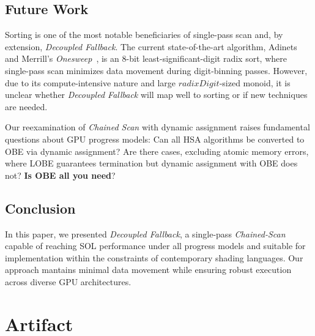 \documentclass[sigconf]{acmart}
\begin{document}
\subsection{Future Work}
Sorting is one of the most notable beneficiaries of single-pass scan and, by extension, \emph{Decoupled Fallback}. The current state-of-the-art algorithm, Adinets and Merrill’s \emph{Onesweep}~\cite{adinets2022onesweepfastersignificantdigit}, is an 8-bit least-significant-digit radix sort, where single-pass scan minimizes data movement during digit-binning passes. However, due to its compute-intensive nature and large $radixDigit$-sized monoid, it is unclear whether \emph{Decoupled Fallback} will map well to sorting or if new techniques are needed.

Our reexamination of \emph{Chained Scan} with dynamic assignment raises fundamental questions about GPU progress models: Can all HSA algorithms be converted to OBE via dynamic assignment? Are there cases, excluding atomic memory errors, where LOBE guarantees termination but dynamic assignment with OBE does not? \textbf{Is OBE all you need}?

\subsection{Conclusion}
In this paper, we presented \emph{Decoupled Fallback}, a single-pass \emph{Chained-Scan} capable of reaching SOL performance under all progress models and suitable for implementation within the constraints of contemporary shading languages. Our approach mantains minimal data movement while ensuring robust execution across diverse GPU architectures.

\begin{acks}
\end{acks}

\clearpage
\appendix
\section{Artifact}
\end{document}
